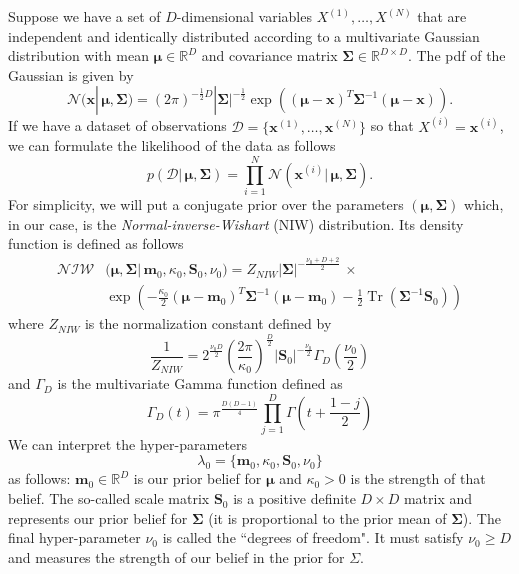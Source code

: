 \documentclass[final,3p,times,twocolumn]{elsarticle}
\DeclareMathOperator*{\Tr}{Tr}
\let\bs\boldsymbol
\begin{document}
Suppose we have a set of $D$-dimensional variables $X^{(1)},\dots,X^{(N)}$ that are independent and identically distributed according to a multivariate Gaussian distribution with mean $\bs\mu \in \mathbb{R}^D$ and covariance matrix $\bs\Sigma \in \mathbb{R}^{D\times D}$. 
The pdf of the Gaussian is given by
\begin{equation*}
\mathcal{N}(\bs x|\,\bs\mu,\bs\Sigma) = (2\pi)^{-\frac{1}{2}D}|\bs\Sigma|^{-\frac{1}{2}} \exp \left((\bs\mu-\bs x)^T \bs\Sigma^{-1} (\bs\mu-\bs x) \right).
\end{equation*}
If we have a dataset of observations $\mathcal{D} = \{\bs x^{(1)},\dots,\bs x^{(N)}\}$ so that $X^{(i)} = \bs x^{(i)}$, we can formulate the likelihood of the data as follows
\begin{equation*}
p(\mathcal{D}|\,\bs\mu,\bs\Sigma) = \prod_{i=1}^N \mathcal{N}(\bs x^{(i)}|\,\bs \mu,\bs \Sigma).
\end{equation*}
For simplicity, we will put a conjugate prior over the parameters $(\bs\mu,\bs\Sigma)$ which, in our case, is the \emph{Normal-inverse-Wishart} (NIW) distribution.
Its density function is defined as follows
\begin{equation*}
\begin{split}
\mathcal{NIW}&(\bs\mu,\bs\Sigma|\,\bs m_0,\kappa_0,\bs S_0,\nu_0) = Z_{NIW}|\bs\Sigma|^{-\frac{\nu_0+D+2}{2}} \,\times\\
& \exp\left(-\frac{\kappa_0}{2}(\bs\mu-\bs m_0)^T\bs\Sigma^{-1}(\bs\mu-\bs m_0) -\frac{1}{2}\Tr(\bs\Sigma^{-1}\bs S_0) \right)
\end{split}
\end{equation*}
where $Z_{NIW}$ is the normalization constant defined by
\begin{equation*}
\frac{1}{Z_{NIW}} = 2^{\frac{\nu_0 D}{2}}\left(\frac{2\pi}{\kappa_0}\right)^{\frac{D}{2}}|\bs S_0|^{-\frac{\nu_0}{2}}\Gamma_D \left(\frac{\nu_0}{2}\right)
\end{equation*}
and $\Gamma_D$ is the multivariate Gamma function defined as
\begin{equation*}
\Gamma_D(t) = \pi^{\frac{D(D-1)}{4}} \prod_{j=1}^D \Gamma\left(t + \frac{1-j}{2}\right)
\end{equation*}
We can interpret the hyper-parameters
\begin{equation*}
\lambda_0 = \{\bs m_0,\kappa_0,\bs S_0,\nu_0\}
\end{equation*}
as follows:
$\bs m_0 \in \mathbb{R}^D$ is our prior belief for $\bs \mu$ and $\kappa_0 > 0$ is the strength of that belief.
The so-called scale matrix $\bs S_0$ is a positive definite $D\times D$ matrix and represents our prior belief for $\bs \Sigma$ (it is proportional to the prior mean of $\bs\Sigma$).
The final hyper-parameter $\nu_0$ is called the ``degrees of freedom".
It must satisfy $\nu_0 \geq D$ and measures the strength of our belief in the prior for $\Sigma$.
\end{document}
